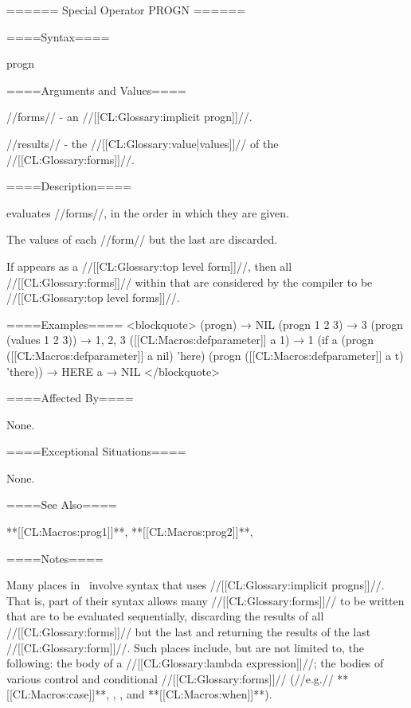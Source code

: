 ====== Special Operator PROGN ======

====Syntax====

\DefspecWithValues progn {} {}

====Arguments and Values====

//forms// - an //[[CL:Glossary:implicit progn]]//.

//results// - the //[[CL:Glossary:value|values]]// of the //[[CL:Glossary:forms]]//.

====Description====

 evaluates //forms//, in the order in which they are given.

The values of each //form// but the last are discarded.

If  appears as a //[[CL:Glossary:top level form]]//, then all //[[CL:Glossary:forms]]// within that  are considered by the compiler to be //[[CL:Glossary:top level forms]]//.

====Examples==== <blockquote> (progn) → NIL (progn 1 2 3) → 3 (progn (values 1 2 3)) → 1, 2, 3 ([[CL:Macros:defparameter]] a 1) → 1 (if a (progn ([[CL:Macros:defparameter]] a nil) 'here) (progn ([[CL:Macros:defparameter]] a t) 'there)) → HERE a → NIL </blockquote>

====Affected By====

None.

====Exceptional Situations====

None.

====See Also====

**[[CL:Macros:prog1]]**, **[[CL:Macros:prog2]]**, {\secref\Evaluation}

====Notes====

Many places in \clisp\ involve syntax that uses //[[CL:Glossary:implicit progns]]//. That is, part of their syntax allows many //[[CL:Glossary:forms]]// to be written that are to be evaluated sequentially, discarding the results of all //[[CL:Glossary:forms]]// but the last and returning the results of the last //[[CL:Glossary:form]]//. Such places include, but are not limited to, the following: the body of a //[[CL:Glossary:lambda expression]]//; the bodies of various control and conditional //[[CL:Glossary:forms]]// (//e.g.// **[[CL:Macros:case]]**, , , and **[[CL:Macros:when]]**).

